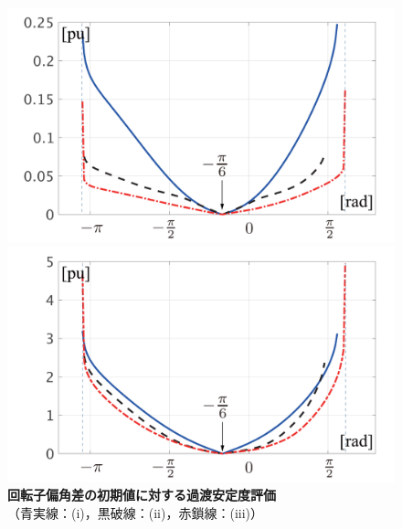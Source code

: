 \documentclass[tombow,dvipdfmx]{corona-a5-1.1}
\begin{document}
\begin{figure}[t]
  \centering
  {
  \begin{minipage}{0.49\linewidth}
    \centering
    \includegraphics[width = 1.0\linewidth]{figs/transientL2w}
  \end{minipage}
  \begin{minipage}{0.49\linewidth}
    \centering
    \includegraphics[width = 1.0\linewidth]{figs/transientL2V}
  \end{minipage}
  \medskip
  \caption{\textbf{回転子偏角差の初期値に対する過渡安定度評価} 
  \\ \centering（青実線：(i)，黒破線：(ii)，赤鎖線：(iii)）}
  \label{fig:transientL2}
  }
\medskip
\end{figure}
\end{document}
